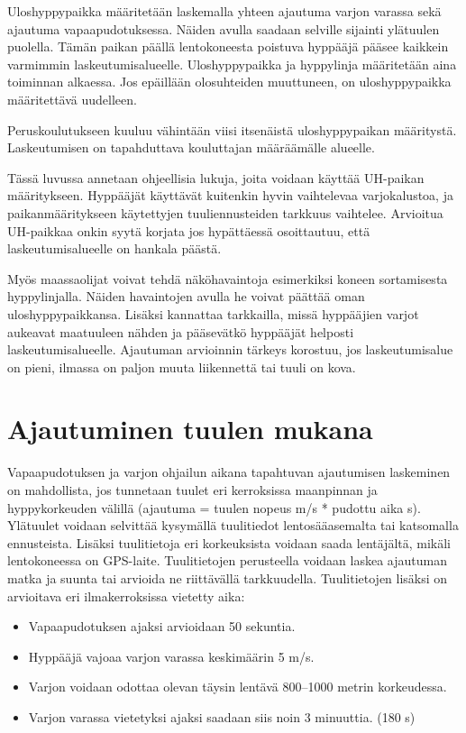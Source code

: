 
Uloshyppypaikka määritetään laskemalla yhteen ajautuma varjon varassa sekä ajautuma vapaapudotuksessa. Näiden avulla saadaan selville sijainti ylätuulen puolella. Tämän paikan päällä lentokoneesta poistuva hyppääjä pääsee kaikkein varmimmin laskeutumisalueelle. Uloshyppypaikka ja hyppylinja määritetään aina toiminnan alkaessa. Jos epäillään olosuhteiden muuttuneen, on uloshyppypaikka määritettävä uudelleen. 


Peruskoulutukseen kuuluu vähintään viisi itsenäistä uloshyppypaikan määritystä. Laskeutumisen on tapahduttava kouluttajan määräämälle alueelle. 


Tässä luvussa annetaan ohjeellisia lukuja, joita voidaan käyttää UH-paikan määritykseen. Hyppääjät käyttävät kuitenkin hyvin vaihtelevaa varjokalustoa, ja paikanmääritykseen käytettyjen tuuliennusteiden tarkkuus vaihtelee. Arvioitua UH-paikkaa onkin syytä korjata jos hypättäessä osoittautuu, että laskeutumisalueelle on hankala päästä. 


Myös maassaolijat voivat tehdä näköhavaintoja esimerkiksi koneen sortamisesta hyppylinjalla. Näiden havaintojen avulla he voivat päättää oman uloshyppypaikkansa. Lisäksi kannattaa tarkkailla, missä hyppääjien varjot aukeavat maatuuleen nähden ja pääsevätkö hyppääjät helposti laskeutumisalueelle. Ajautuman arvioinnin tärkeys korostuu, jos laskeutumisalue on pieni, ilmassa on paljon muuta liikennettä tai tuuli on kova. 

\section{ Ajautuminen tuulen mukana }
\label{uloshyppypaikan-maaritys-ajautuminen-tuulen-mukana}


Vapaapudotuksen ja varjon ohjailun aikana tapahtuvan ajautumisen laskeminen on mahdollista, jos tunnetaan tuulet eri kerroksissa maanpinnan ja hyppykorkeuden välillä (ajautuma = tuulen nopeus m/s * pudottu aika s). Ylätuulet voidaan selvittää kysymällä tuulitiedot lentosääasemalta tai katsomalla ennusteista. Lisäksi tuulitietoja eri korkeuksista voidaan saada lentäjältä, mikäli lentokoneessa on GPS-laite. Tuulitietojen perusteella voidaan laskea ajautuman matka ja suunta tai arvioida ne riittävällä tarkkuudella. Tuulitietojen lisäksi on arvioitava eri ilmakerroksissa vietetty aika: 

\begin{itemize}
\item  Vapaapudotuksen ajaksi arvioidaan 50 sekuntia. 
\item  Hyppääjä vajoaa varjon varassa keskimäärin 5 m/s. 
\item  Varjon voidaan odottaa olevan täysin lentävä 800–1000 metrin korkeudessa. 
\item  Varjon varassa vietetyksi ajaksi saadaan siis noin 3 minuuttia. (180 s) 
\end{itemize}

